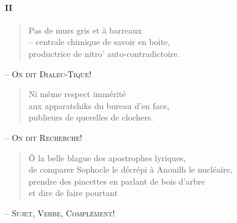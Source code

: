   \paragraph*{II}
    \begin{verse}
      Pas de murs gris et à barreaux\\
      -- centrale chimique de savoir en boite,\\
      productrice de nitro’ auto-contradictoire.
    \end{verse}
    \begin{center}
      -- \textsc{On dit Dialec-Tique!}
    \end{center}
    \begin{verse}
      Ni même respect immérité\\
      aux apparatchiks du bureau d’en face,\\
      publieurs de querelles de clochers.
    \end{verse}
    \begin{center}
      -- \textsc{On dit Recherche!}
    \end{center}
    \begin{verse}
      Ô la belle blague des apostrophes lyriques,\\
      de comparer Sophocle le décrépi à Anouilh le nucléaire,\\
      prendre des pincettes en parlant de bois d’arbre\\
      et dire de faire pourtant
    \end{verse}
    \begin{center}
      -- \textsc{Sujet, Verbe, Complément!}
    \end{center}
